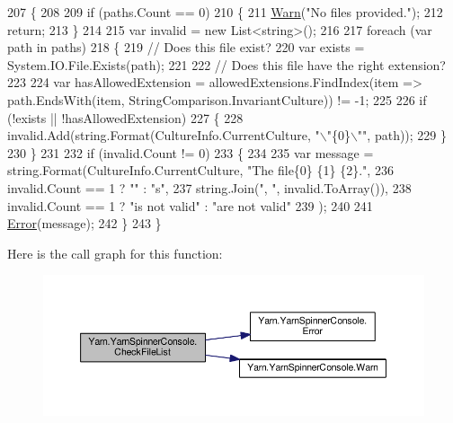 \begin{DoxyCode}
207         \{
208 
209             \textcolor{keywordflow}{if} (paths.Count == 0)
210             \{
211                 \hyperlink{a00195_a979bb6f049b6c5294f745a19e24ddd9d}{Warn}(\textcolor{stringliteral}{"No files provided."});
212                 \textcolor{keywordflow}{return};
213             \}
214 
215             var invalid = \textcolor{keyword}{new} List<string>();
216 
217             \textcolor{keywordflow}{foreach} (var path \textcolor{keywordflow}{in} paths)
218             \{
219                 \textcolor{comment}{// Does this file exist?}
220                 var exists = System.IO.File.Exists(path);
221 
222                 \textcolor{comment}{// Does this file have the right extension?}
223 
224                 var hasAllowedExtension = allowedExtensions.FindIndex(item => path.EndsWith(item, 
      StringComparison.InvariantCulture)) != -1;
225 
226                 \textcolor{keywordflow}{if} (!exists || !hasAllowedExtension)
227                 \{
228                     invalid.Add(string.Format(CultureInfo.CurrentCulture, \textcolor{stringliteral}{"\(\backslash\)"\{0\}\(\backslash\)""}, path));
229                 \}
230             \}
231 
232             \textcolor{keywordflow}{if} (invalid.Count != 0)
233             \{
234 
235                 var message = string.Format(CultureInfo.CurrentCulture, \textcolor{stringliteral}{"The file\{0\} \{1\} \{2\}."},
236                     invalid.Count == 1 ? \textcolor{stringliteral}{""} : \textcolor{stringliteral}{"s"},
237                                             string.Join(\textcolor{stringliteral}{", "}, invalid.ToArray()),
238                     invalid.Count == 1 ? \textcolor{stringliteral}{"is not valid"} : \textcolor{stringliteral}{"are not valid"}
239                 );
240 
241                 \hyperlink{a00195_a2f63f9f5b7634cb50ee75ff2eb18b137}{Error}(message);
242             \}
243         \}
\end{DoxyCode}


Here is the call graph for this function\-:
\nopagebreak
\begin{figure}[H]
\begin{center}
\leavevmode
\includegraphics[width=350pt]{a00195_ad77564b25725a771f0fd4da430582e6f_cgraph}
\end{center}
\end{figure}




